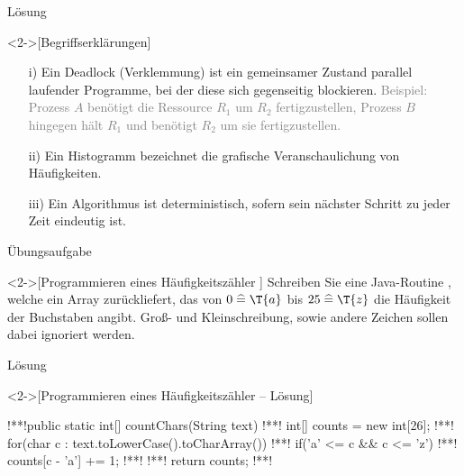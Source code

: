 \begin{frame}[c,fragile]{Lösung}
    \begin{solve}<2->[Begriffserklärungen]
        \begin{enumerate}[<+(1)->]
            \item[i)] Ein Deadlock (Verklemmung) ist ein gemeinsamer Zustand parallel laufender Programme,\pause{} bei der diese sich gegenseitig blockieren.\pause{} \textcolor{gray}{Beispiel:\pause{} Prozess \(A\) benötigt die Ressource \(R_1\) um \(R_2\) fertigzustellen,\pause{} Prozess \(B\) hingegen hält \(R_1\) und benötigt \(R_2\) um sie fertigzustellen.}
            \item[ii)] Ein Histogramm bezeichnet die grafische Veranschaulichung von Häufigkeiten.
            \item[iii)] Ein Algorithmus ist deterministisch, sofern sein nächster Schritt zu jeder Zeit eindeutig ist.
        \end{enumerate}
    \end{solve}
\end{frame}

\begin{frame}[c]{Übungsaufgabe}
    \begin{exercise}<2->[Programmieren eines Häufigkeitszähler ]
        \pause{}Schreiben Sie eine Java-Routine , welche ein Array  zurückliefert,\pause{} das von \(0 \;\widehat{=}\; \T{a}\)\pause{} bis \(25 \;\widehat{=}\; \T{z}\) die Häufigkeit der Buchstaben angibt.\pause{} Groß- und Kleinschreibung, sowie andere Zeichen sollen dabei ignoriert werden.
    \end{exercise}
\end{frame}

\begin{frame}[c,fragile]{Lösung}
    \begin{solve}<2->[Programmieren eines Häufigkeitszähler -- Lösung]
        \begin{plainjava}
!**!public static int[] countChars(String text){
!**!    int[] counts = new int[26];
!**!    for(char c : text.toLowerCase().toCharArray()){
!**!        if('a' <= c && c <= 'z')
!**!            counts[c - 'a'] += 1;
!**!    }
!**!    return counts;
!**!}
        \end{plainjava}
    \end{solve}
\end{frame}


